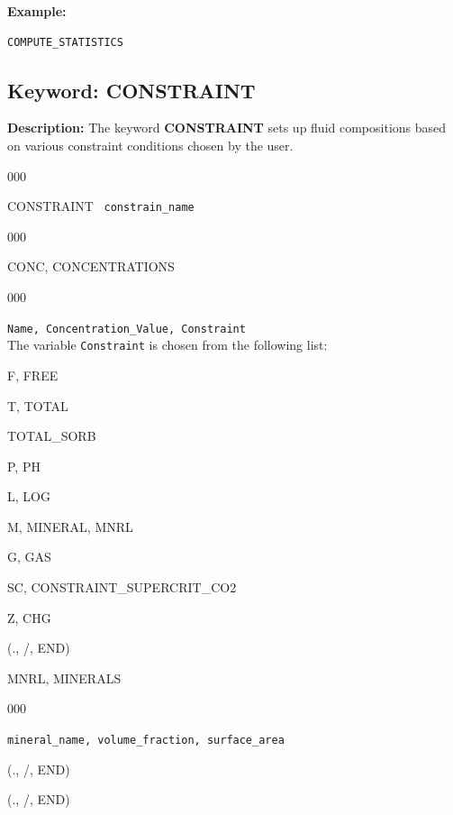 \documentclass[12pt]{article}
\begin{document}

\noindent
{\bf Example:}
\begin{verbatim}
COMPUTE_STATISTICS
\end{verbatim}


\newpage
\protect\hypertarget{target_constraint}{}

\subsection{Keyword: CONSTRAINT}

\noindent
{\bf Description:}
The keyword {\bf CONSTRAINT} sets up fluid compositions based on various constraint conditions chosen by the user.

\begin{deflist}{000}
\item [CONSTRAINT] \ {\tt constrain\_name}
\begin{deflist}{000}
\item[CONC, CONCENTRATIONS]
\begin{deflist}{000}
\item[{\tt Name, Concentration\_Value, Constraint}] ~\\
The variable {\tt Constraint} is chosen from the following list:
\item[F, FREE]
\item[T, TOTAL] 
\item[TOTAL\_SORB]
\item[P, PH]
\item[L, LOG] 
\item[M, MINERAL, MNRL]
\item[G, GAS]
\item[SC, CONSTRAINT\_SUPERCRIT\_CO2] 
\item[Z, CHG]
\end{deflist}
\item[(., /, END)]
\item[MNRL, MINERALS] ~
\begin{deflist}{000}
\item[{\tt mineral\_name, volume\_fraction, surface\_area}]
\end{deflist}
\item[(., /, END)]
\end{deflist}
\item[(., /, END)]
\end{deflist}
\end{document}
